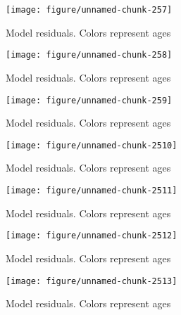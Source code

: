 \documentclass[a4paper]{article}\usepackage{graphicx, color}
\makeatletter
\def\maxwidth{ %
  \ifdim\Gin@nat@width>\linewidth
    \linewidth
  \else
    \Gin@nat@width
  \fi
}
\newenvironment{knitrout}{}{} %
\makeatother
\begin{document}
\begin{knitrout}
\begin{figure}[H]
{\centering \texttt{[image: figure/unnamed-chunk-257]} 

}

\caption[Model residuals]{Model residuals. Colors represent ages\label{fig:unnamed-chunk-257}}
\end{figure}
\begin{figure}[H]


{\centering \texttt{[image: figure/unnamed-chunk-258]} 

}

\caption[Model residuals]{Model residuals. Colors represent ages\label{fig:unnamed-chunk-258}}
\end{figure}
\begin{figure}[H]


{\centering \texttt{[image: figure/unnamed-chunk-259]} 

}

\caption[Model residuals]{Model residuals. Colors represent ages\label{fig:unnamed-chunk-259}}
\end{figure}
\begin{figure}[H]


{\centering \texttt{[image: figure/unnamed-chunk-2510]} 

}

\caption[Model residuals]{Model residuals. Colors represent ages\label{fig:unnamed-chunk-2510}}
\end{figure}
\begin{figure}[H]


{\centering \texttt{[image: figure/unnamed-chunk-2511]} 

}

\caption[Model residuals]{Model residuals. Colors represent ages\label{fig:unnamed-chunk-2511}}
\end{figure}
\begin{figure}[H]


{\centering \texttt{[image: figure/unnamed-chunk-2512]} 

}

\caption[Model residuals]{Model residuals. Colors represent ages\label{fig:unnamed-chunk-2512}}
\end{figure}
\begin{figure}[H]


{\centering \texttt{[image: figure/unnamed-chunk-2513]} 

}

\caption[Model residuals]{Model residuals. Colors represent ages\label{fig:unnamed-chunk-2513}}
\end{figure}
\begin{figure}[H]



\end{figure}
\end{knitrout}
\end{document}
